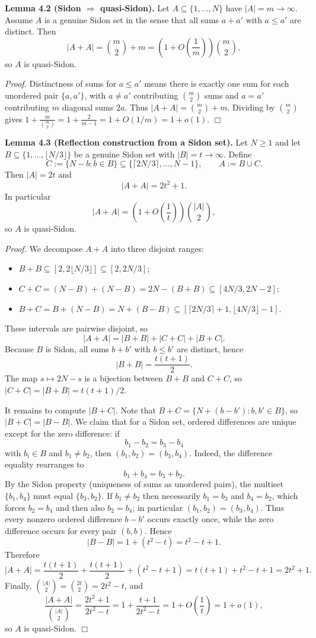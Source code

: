 \medskip
\noindent\textbf{Lemma 4.2 (Sidon $\Rightarrow$ quasi-Sidon).}
Let $A\subseteq\{1,\dots,N\}$ have $|A|=m\to\infty$.
Assume $A$ is a genuine Sidon set in the sense that all sums $a+a'$ with $a\le a'$ are distinct.
Then
\[
|A+A| = \binom{m}{2}+m = \left(1+O\left(\frac{1}{m}\right)\right)\binom{m}{2},
\]
so $A$ is quasi-Sidon.

\noindent\emph{Proof.}
Distinctness of sums for $a\le a'$ means there is exactly one sum for each unordered pair $\{a,a'\}$, with $a\ne a'$ contributing $\binom{m}{2}$ sums and $a=a'$ contributing $m$ diagonal sums $2a$.
Thus $|A+A|=\binom{m}{2}+m$.
Dividing by $\binom{m}{2}$ gives $1+\frac{m}{\binom{m}{2}}=1+\frac{2}{m-1}=1+O(1/m)=1+o(1)$.
\hfill$\Box$

\medskip
\noindent\textbf{Lemma 4.3 (Reflection construction from a Sidon set).}
Let $N\ge 1$ and let $B\subseteq\{1,\dots,\lfloor N/3\rfloor\}$ be a genuine Sidon set with $|B|=t\to\infty$.
Define
\[
C:=\{N-b: b\in B\}\subseteq\{\lceil 2N/3\rceil,\dots,N-1\},
\qquad A:=B\cup C.
\]
Then $|A|=2t$ and
\[
|A+A| = 2t^2+1.
\]
In particular
\[
|A+A| = \left(1+O\left(\frac{1}{t}\right)\right)\binom{|A|}{2},
\]
so $A$ is quasi-Sidon.

\noindenti\emph{Proof.}
We decompose $A+A$ into three disjoint ranges:
\begin{itemize}
\item $B+B \subseteq [2,2\lfloor N/3\rfloor] \subseteq [2,2N/3]$;
\item $C+C = (N-B)+(N-B)=2N-(B+B) \subseteq [4N/3,2N-2]$;
\item $B+C = B+(N-B)=N+(B-B) \subseteq [\lceil 2N/3\rceil+1, \lfloor 4N/3\rfloor-1]$.
\end{itemize}
These intervals are pairwise disjoint, so
\[
|A+A| = |B+B| + |C+C| + |B+C|.
\]
Because $B$ is Sidon, all sums $b+b'$ with $b\le b'$ are distinct, hence
\[
|B+B|=\frac{t(t+1)}{2}.
\]
The map $s\mapsto 2N-s$ is a bijection between $B+B$ and $C+C$, so $|C+C|=|B+B|=t(t+1)/2$.

It remains to compute $|B+C|$.
Note that $B+C = \{N + (b-b'): b,b'\in B\}$, so $|B+C| = |B-B|$.
We claim that for a Sidon set, ordered differences are unique except for the zero difference:
if
\[
b_1-b_2=b_3-b_4
\]
with $b_i\in B$ and $b_1\ne b_2$, then $(b_1,b_2)=(b_3,b_4)$.
Indeed, the difference equality rearranges to
\[
b_1+b_4 = b_3+b_2.
\]
By the Sidon property (uniqueness of sums as unordered pairs), the multiset $\{b_1,b_4\}$ must equal $\{b_3,b_2\}$.
If $b_1\ne b_2$ then necessarily $b_1=b_3$ and $b_4=b_2$, which forces $b_2=b_4$ and then also $b_2=b_4$; in particular $(b_1,b_2)=(b_3,b_4)$.
Thus every nonzero ordered difference $b-b'$ occurs exactly once, while the zero difference occurs for every pair $(b,b)$.
Hence
\[
|B-B| = 1 + (t^2-t) = t^2-t+1.
\]
Therefore
\[
|A+A| = \frac{t(t+1)}{2}+\frac{t(t+1)}{2}+(t^2-t+1) = t(t+1)+t^2-t+1 = 2t^2+1.
\]
Finally, $\binom{|A|}{2}=\binom{2t}{2}=2t^2-t$, and
\[
\frac{|A+A|}{\binom{|A|}{2}} = \frac{2t^2+1}{2t^2-t} = 1 + \frac{t+1}{2t^2-t} = 1+O\left(\frac{1}{t}\right)=1+o(1),
\]
so $A$ is quasi-Sidon.
\hfill$\Box$


